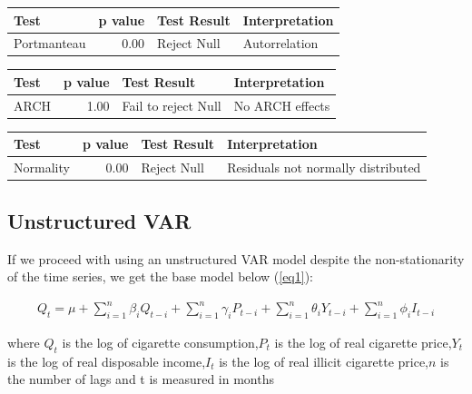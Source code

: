 \documentclass[11pt,preprint, authoryear]{elsarticle}
\let\origtable\table
\let\endorigtable\endtable
\renewenvironment{table}[1][2] {
    \expandafter\origtable\expandafter[H]
} {
    \endorigtable
}
\numberwithin{equation}{section}
\numberwithin{figure}{section}
\numberwithin{table}{section}
\begin{document}
\begin{table}[H]
\centering
\begin{tabular}{lrll}
  \hline
Test & p value & Test Result & Interpretation \\ 
  \hline
Portmanteau & 0.00 & Reject Null & Autorrelation \\ 
   \hline
\end{tabular}
\caption{Serial Correlcation Test \label{diag}} 
\end{table}
\begin{table}[H]
\centering
\begin{tabular}{lrll}
  \hline
Test & p value & Test Result & Interpretation \\ 
  \hline
ARCH & 1.00 & Fail to reject Null & No ARCH effects \\ 
   \hline
\end{tabular}
\caption{ARCH Tests \label{archh}} 
\end{table}
\begin{table}[H]
\centering
\begin{tabular}{lrll}
  \hline
Test & p value & Test Result & Interpretation \\ 
  \hline
Normality & 0.00 & Reject Null & Residuals not normally distributed \\ 
   \hline
\end{tabular}
\caption{ARCH Tests \label{archh}} 
\end{table}

\hypertarget{unstructured-var}{%
\subsection{Unstructured VAR}\label{unstructured-var}}

If we proceed with using an unstructured VAR model despite the
non-stationarity of the time series, we get the base model below
(\ref{eq1}):

\begin{align}
 Q_t = \mu + \sum_{i = 1}^{n}\beta_iQ_{t-i} +\sum_{i = 1}^{n}\gamma_iP_{t-i} + \sum_{i = 1}^{n}\theta_iY_{t-i} + \sum_{i = 1}^{n}\phi_iI_{t-i} \label{eq1}
\end{align}

where \(Q_t\) is the log of cigarette consumption,\newline \(P_{t}\) is
the log of real cigarette price,\newline \(Y_{t}\) is the log of real
disposable income,\newline \(I_{t}\) is the log of real illicit
cigarette price,\newline \(n\) is the number of lags and t is measured
in months
\end{document}
